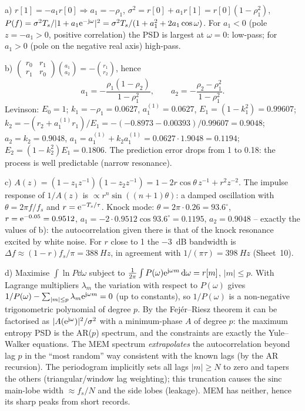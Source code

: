 \begin{solution}
a) $r[1]=-a_1r[0]\Rightarrow a_1=-\rho_1$, $\sigma^2=r[0]+a_1r[1]=r[0](1-\rho_1^2)$,
$P(f)=\sigma^2T_s/|1+a_1\mathrm{e}^{-\mathrm{j}\omega}|^2=\sigma^2T_s/(1+a_1^2+2a_1\cos\omega)$.
For $a_1<0$ (pole $z=-a_1>0$, positive correlation) the PSD is largest at
$\omega=0$: low-pass; for $a_1>0$ (pole on the negative real axis) high-pass.

b) $\begin{pmatrix}r_0&r_1\\r_1&r_0\end{pmatrix}\binom{a_1}{a_2}=-\binom{r_1}{r_2}$, hence
\[
  a_1=-\frac{\rho_1(1-\rho_2)}{1-\rho_1^2},\qquad a_2=-\frac{\rho_2-\rho_1^2}{1-\rho_1^2}.
\]
Levinson: $E_0=1$; $k_1=-\rho_1=0.0627$, $a_1^{(1)}=0.0627$,
$E_1=(1-k_1^2)=0.99607$; $k_2=-(r_2+a_1^{(1)}r_1)/E_1=-(-0.8973-0.00393)/0.99607=0.9048$;
$a_2=k_2=0.9048$, $a_1=a_1^{(1)}+k_2a_1^{(1)}=0.0627\cdot1.9048=0.1194$;
$E_2=(1-k_2^2)E_1=0.1806$. The prediction error drops from 1 to 0.18: the
process is well predictable (narrow resonance).

c) $A(z)=(1-z_1z^{-1})(1-z_2z^{-1})=1-2r\cos\theta\,z^{-1}+r^2z^{-2}$. The impulse
response of $1/A(z)$ is $\propto r^n\sin((n+1)\theta)$: a damped oscillation with
$\theta=2\pi f/f_s$ and $r=\mathrm{e}^{-T_s/\tau}$. Knock mode:
$\theta=2\pi\cdot0.26=93.6^\circ$, $r=\mathrm{e}^{-0.05}=0.9512$,
$a_1=-2\cdot0.9512\cos 93.6^\circ=0.1195$, $a_2=0.9048$ -- exactly the values of b):
the autocorrelation given there is that of the knock resonance excited by white noise.
For $r$ close to 1 the \SI{-3}{dB} bandwidth is $\Delta f\approx(1-r)f_s/\pi=\SI{388}{Hz}$,
in agreement with $1/(\pi\tau)=\SI{398}{Hz}$ (Sheet~10).

d) Maximise $\int\ln P\dd\omega$ subject to
$\frac{1}{2\pi}\int P(\omega)\mathrm{e}^{\mathrm{j}\omega m}\,\mathrm{d}\omega=r[m]$, $|m|\le p$. With
Lagrange multipliers $\lambda_m$ the variation with respect to $P(\omega)$ gives
$1/P(\omega)-\sum_{|m|\le p}\lambda_m\mathrm{e}^{\mathrm{j}\omega m}=0$ (up to constants), so
$1/P(\omega)$ is a non-negative trigonometric polynomial of degree $p$. By the
Fej\'er--Riesz theorem it can be factorised as $|A(\mathrm{e}^{\mathrm{j}\omega})|^2/\sigma^2$ with a
minimum-phase $A$ of degree $p$: the maximum entropy PSD is the AR($p$) spectrum,
and the constraints are exactly the Yule--Walker equations. The MEM spectrum
\emph{extrapolates} the autocorrelation beyond lag $p$ in the ``most random'' way
consistent with the known lags (by the AR recursion). The periodogram implicitly sets
all lags $|m|\ge N$ to zero and tapers the others (triangular/window lag weighting);
this truncation causes the $\mathrm{sinc}$ main-lobe width $\approx f_s/N$ and the
side lobes (leakage). MEM has neither, hence its sharp peaks from short records.


\end{solution}
